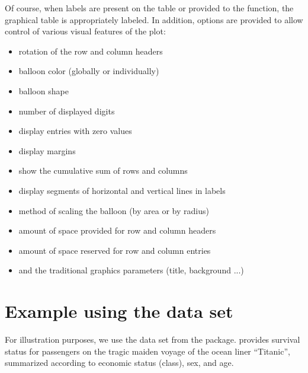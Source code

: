 \documentclass[a4paper]{report}
\begin{document}
\begin{article}
Of course, when labels are present on the table or provided to the
function, the graphical table is appropriately labeled.  In
addition, options are provided to allow control of various visual features
of the plot:

\begin{itemize}
  \item rotation of the row and column headers
  \item balloon color (globally or individually) 
  \item balloon shape 
  \item number of displayed digits
  \item display entries with zero values
  \item display margins
  \item show the cumulative sum of rows and columns
  \item display segments of horizontal and vertical lines in labels
  \item method of scaling the balloon (by area or by radius)
  \item amount of space provided for row and column headers
  \item amount of space reserved for row and column entries
  \item and the traditional graphics parameters (title, background ...)
\end{itemize}

\section*{Example using the  data set}

For illustration purposes, we use the  data set from
the  package.   provides survival status
for passengers on the tragic maiden voyage of the ocean liner
``Titanic'', summarized according to economic status (class), sex, and
age.






\end{article}
\end{document}
